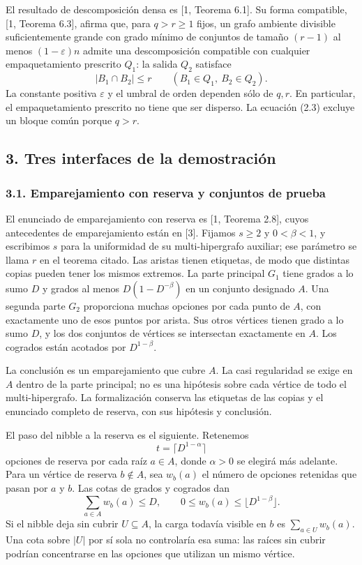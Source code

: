\documentclass[spanish,11pt,a4paper]{article}
\begin{document}
El resultado de descomposición densa es {[}1, Teorema 6.1{]}. Su forma compatible, {[}1, Teorema 6.3{]}, afirma que, para \(q>r\ge1\) fijos, un grafo ambiente divisible suficientemente grande con grado mínimo de conjuntos de tamaño \((r-1)\) al menos \((1-\varepsilon)n\) admite una descomposición compatible con cualquier empaquetamiento prescrito \(Q_1\): la salida \(Q_2\) satisface \[|B_1\cap B_2|\le r
\qquad(B_1\in Q_1,\ B_2\in Q_2).
\tag{2.3}\] La constante positiva \(\varepsilon\) y el umbral de orden dependen sólo de \(q,r\). En particular, el empaquetamiento prescrito no tiene que ser disperso. La ecuación (2.3) excluye un bloque común porque \(q>r\).

\subsection{3. Tres interfaces de la demostración}\label{tres-interfaces-de-la-demostraciuxf3n}


\subsubsection{3.1. Emparejamiento con reserva y conjuntos de prueba}\label{emparejamiento-con-reserva-y-conjuntos-de-prueba}

El enunciado de emparejamiento con reserva es {[}1, Teorema 2.8{]}, cuyos antecedentes de emparejamiento están en {[}3{]}. Fijamos \(s\ge2\) y \(0<\beta<1\), y escribimos \(s\) para la uniformidad de su multi-hipergrafo auxiliar; ese parámetro se llama \(r\) en el teorema citado. Las aristas tienen etiquetas, de modo que distintas copias pueden tener los mismos extremos. La parte principal \(G_1\) tiene grados a lo sumo \(D\) y grados al menos \(D(1-D^{-\beta})\) en un conjunto designado \(A\). Una segunda parte \(G_2\) proporciona muchas opciones por cada punto de \(A\), con exactamente uno de esos puntos por arista. Sus otros vértices tienen grado a lo sumo \(D\), y los dos conjuntos de vértices se intersectan exactamente en \(A\). Los cogrados están acotados por \(D^{1-\beta}\).

La conclusión es un emparejamiento que cubre \(A\). La casi regularidad se exige en \(A\) dentro de la parte principal; no es una hipótesis sobre cada vértice de todo el multi-hipergrafo. La formalización conserva las etiquetas de las copias y el enunciado completo de reserva, con sus hipótesis y conclusión.

El paso del nibble a la reserva es el siguiente. Retenemos \[t=\lceil D^{1-\alpha}\rceil\] opciones de reserva por cada raíz \(a\in A\), donde \(\alpha>0\) se elegirá más adelante. Para un vértice de reserva \(b\notin A\), sea \(w_b(a)\) el número de opciones retenidas que pasan por \(a\) y \(b\). Las cotas de grados y cogrados dan \[\sum_{a\in A}w_b(a)\le D,
\qquad
0\le w_b(a)\le\lfloor D^{1-\beta}\rfloor.
\tag{3.1}\] Si el nibble deja sin cubrir \(U\subseteq A\), la carga todavía visible en \(b\) es \(\sum_{a\in U}w_b(a)\). Una cota sobre \(|U|\) por sí sola no controlaría esa suma: las raíces sin cubrir podrían concentrarse en las opciones que utilizan un mismo vértice.
\end{document}

